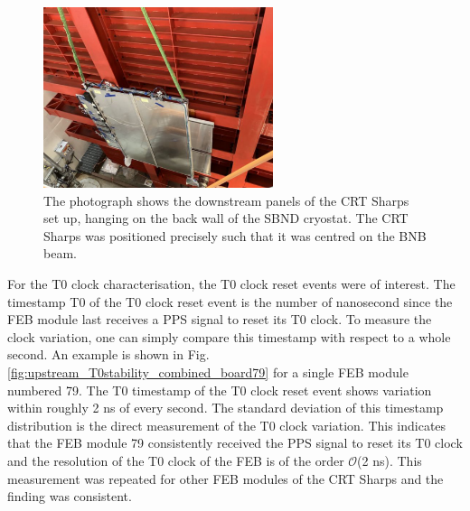 \begin{figure}[htbp!] 
\centering    
\includegraphics[width=0.6\textwidth]{crt_sharps}
\caption[crt_sharps]{
The photograph shows the downstream panels of the CRT Sharps set up, hanging on the back wall of the SBND cryostat. 
The CRT Sharps was positioned precisely such that it was centred on the BNB beam.
}
\label{fig:crt_sharps}
\end{figure}

For the T0 clock characterisation, the T0 clock reset events were of interest.
The timestamp T0 of the T0 clock reset event is the number of nanosecond since the FEB module last receives a PPS signal to reset its T0 clock.
To measure the clock variation, one can simply compare this timestamp with respect to a whole second.
An example is shown in Fig. \ref{fig:upstream_T0stability_combined_board79} for a single FEB module numbered 79.
The T0 timestamp of the T0 clock reset event shows variation within roughly 2 ns of every second. 
The standard deviation of this timestamp distribution is the direct measurement of the T0 clock variation.
This indicates that the FEB module 79 consistently received the PPS signal to reset its T0 clock and the resolution of the T0 clock of the FEB is of the order $\mathcal{O}$(2 ns).
This measurement was repeated for other FEB modules of the CRT Sharps and the finding was consistent.

